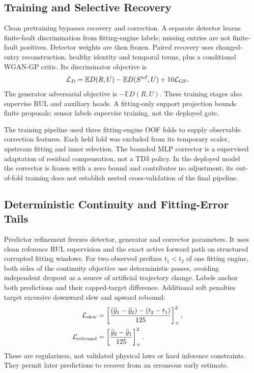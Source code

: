 \documentclass[conference]{IEEEtran}
\begin{document}
\subsection{\textbf{Training and Selective Recovery}}
Clean pretraining bypasses recovery and correction. A separate detector learns
finite-fault discrimination from fitting-engine labels; missing entries are not
finite-fault positives. Detector weights are then frozen. Paired recovery uses
changed-entry reconstruction, healthy identity and temporal terms, plus a
conditional WGAN-GP critic. Its discriminator objective is
\begin{equation}
\mathcal L_D=\mathbb E D(R,U)-\mathbb E D(S^{\rm ref},U)+10\mathcal L_{\rm GP}.
\end{equation}
The generator adversarial objective is $-\mathbb E D(R,U)$. These training stages
also supervise RUL and auxiliary heads. A fitting-only support projection bounds
finite proposals; sensor labels supervise training, not the deployed gate.

The training pipeline used three fitting-engine OOF folds to supply observable
correction features. Each held fold was excluded from its temporary scaler,
upstream fitting and inner selection. The bounded MLP corrector is a supervised
adaptation of residual compensation, not a TD3 policy. In the deployed model the corrector
is frozen with a zero bound and contributes no adjustment; its out-of-fold
training does not establish nested cross-validation of the final pipeline.

\subsection{\textbf{Deterministic Continuity and Fitting-Error Tails}}
Predictor refinement freezes detector, generator and corrector parameters. It
uses clean reference RUL supervision and the exact active forward path on
structured corrupted fitting windows. For two observed prefixes $t_1<t_2$ of
one fitting engine, both sides of the continuity objective use deterministic
passes, avoiding independent dropout as a source of artificial trajectory change.
Labels anchor both predictions and their capped-target difference. Additional
soft penalties target excessive downward slew and upward rebound:
\begin{align}
\mathcal L_{\rm slew}&=\left[\frac{(\widehat y_1-\widehat y_2)-(t_2-t_1)}{125}\right]_+^2,\\
\mathcal L_{\rm rebound}&=\left[\frac{\widehat y_2-\widehat y_1}{125}\right]_+^2.
\end{align}
These are regularizers, not validated physical laws or hard inference constraints.
They permit later predictions to recover from an erroneous early estimate.
\end{document}
